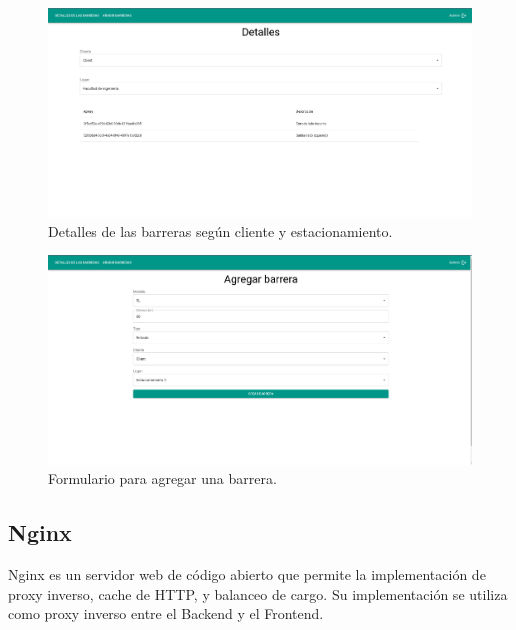 \begin{figure}
    \centering
    \includegraphics[width=\textwidth]{imgs/server/admin-details.png}
    \caption{Detalles de las barreras según cliente y estacionamiento.}
    \label{fig:admin-details}
\end{figure}

\begin{figure}
    \centering
    \includegraphics[width=\textwidth]{imgs/server/add-barrier.png}
    \caption{Formulario para agregar una barrera.}
    \label{fig:add-barrier}
\end{figure}

\subsection{Nginx}

Nginx es un servidor web de código abierto que permite la implementación de proxy inverso, cache de HTTP, y balanceo de cargo.
Su implementación se utiliza como proxy inverso entre el Backend y el Frontend.

